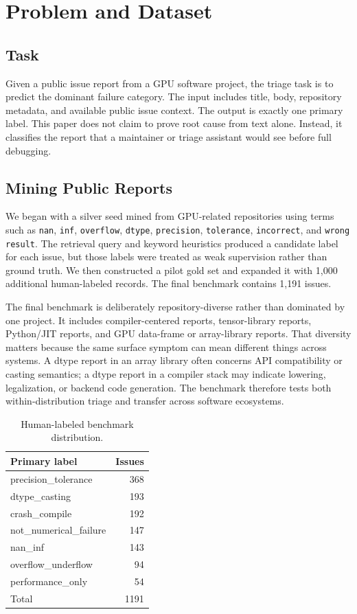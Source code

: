\documentclass[sigplan,10pt]{acmart}
\begin{document}
\section{Problem and Dataset}

\subsection{Task}

Given a public issue report from a GPU software project, the triage task is to
predict the dominant failure category. The input includes title, body, repository
metadata, and available public issue context. The output is exactly one primary
label. This paper does not claim to prove root cause from text alone. Instead,
it classifies the report that a maintainer or triage assistant would see before
full debugging.

\subsection{Mining Public Reports}

We began with a silver seed mined from GPU-related repositories using terms such
as \texttt{nan}, \texttt{inf}, \texttt{overflow}, \texttt{dtype},
\texttt{precision}, \texttt{tolerance}, \texttt{incorrect}, and
\texttt{wrong result}. The retrieval query and keyword heuristics produced a
candidate label for each issue, but those labels were treated as weak
supervision rather than ground truth. We then constructed a pilot gold set and
expanded it with 1,000 additional human-labeled records. The final benchmark
contains 1,191 issues.

The final benchmark is deliberately repository-diverse rather than dominated by
one project. It includes compiler-centered reports, tensor-library reports,
Python/JIT reports, and GPU data-frame or array-library reports. That diversity
matters because the same surface symptom can mean different things across
systems. A dtype report in an array library often concerns API compatibility or
casting semantics; a dtype report in a compiler stack may indicate lowering,
legalization, or backend code generation. The benchmark therefore tests both
within-distribution triage and transfer across software ecosystems.

\begin{table}[t]
\centering
\caption{Human-labeled benchmark distribution.}
\label{tab:labels}
\begin{tabular}{lr}
\toprule
Primary label & Issues \\
\midrule
precision\_tolerance & 368 \\
dtype\_casting & 193 \\
crash\_compile & 192 \\
not\_numerical\_failure & 147 \\
nan\_inf & 143 \\
overflow\_underflow & 94 \\
performance\_only & 54 \\
\midrule
Total & 1191 \\
\bottomrule
\end{tabular}
\end{table}
\end{document}
